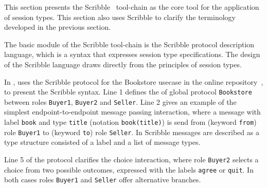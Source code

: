 This section presents the Scribble~\cite{scribble} tool-chain
as the core tool for the application of session types.
This section also uses Scribble to clarify the terminology
developed in the previous section.

The basic module of the Scribble tool-chain is the
Scribble protocol description language,
which is a syntax that expresses session type specifications.
The design of the Scribble language draws directly from
the principles of session types.



In , uses the Scribble protocol for the
Bookstore usecase in the online repository~\cite{usecase_repository},
to present the Scribble syntax.
Line 1 defines the 
of global protocol \lstinline|Bookstore| between
roles \lstinline|Buyer1|, \lstinline|Buyer2| and \lstinline|Seller|.
Line 2 gives an example of the simplest endpoint-to-endpoint
message passing interaction,
where a message with
label \lstinline|book| and type \lstinline|title| (notation \lstinline|book(title)|)
is send from (keyword \lstinline|from|) role \lstinline|Buyer1| to (keyword \lstinline|to|)
role \lstinline{Seller}.
In Scribble messages are described as a type structure
consisted of a label and a list of message types.


Line 5 of the protocol clarifies the choice interaction, where
role \lstinline|Buyer2| selects a choice from two possible outcomes,
expressed with the labels \lstinline|agree| or \lstinline|quit|. In 
both cases roles \lstinline|Buyer1| and \lstinline|Seller| offer
alternative branches.









\begin{comment}
For example Scribble code:
%
\begin{lstlisting}
  msg(int) from A to B;
\end{lstlisting}
%
describes the global protocol between role \lstinline|A| and \lstinline|B|,
where participant \lstinline|A| sends message of type \lstinline|msg(int)|
to participant \lstinline|B|. From the local perspective of participant
\lstinline|A| the protocol would be:
%
\begin{lstlisting}
  msg(int) to B;
\end{lstlisting}
%
where it describes the sending of message \lstinline|msg(int)|
to participant \lstinline|B|.
\end{comment}



